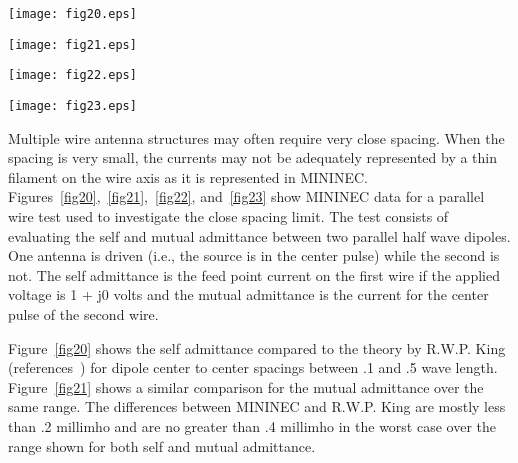 \documentclass[12pt]{article}
\begin{document}
\begin{sidewaysfigure}[htb]
\centerline{\texttt{[image: fig20.eps]}}
\caption{Self admittance computed by MININEC compared to the theory by
R. W. P. King for two parallel dipoles}
\label{fig20}
\end{sidewaysfigure}

\begin{sidewaysfigure}[htb]
\centerline{\texttt{[image: fig21.eps]}}
\caption{Mutual admittance computed by MININEC compared to the theory by
R. W. P. King for two parallel dipoles}
\label{fig21}
\end{sidewaysfigure}

\begin{sidewaysfigure}[htb]
\centerline{\texttt{[image: fig22.eps]}}
\caption{Magnitude of the mutual admittance between closely spaced
parallel dipoles}
\label{fig22}
\end{sidewaysfigure}

\begin{sidewaysfigure}[htb]
\centerline{\texttt{[image: fig23.eps]}}
\caption{Phase of the mutual admittance between closely spaced
parallel dipoles}
\label{fig23}
\end{sidewaysfigure}
\afterpage\clearpage

Multiple wire antenna structures may often require very close spacing.
When the spacing is very small, the currents may not be adequately
represented by a thin filament on the wire axis as it is represented in
MININEC. Figures~\ref{fig20},~\ref{fig21},~\ref{fig22}, and~\ref{fig23}
show MININEC data for a parallel wire test used to investigate the close
spacing limit. The test consists of evaluating the self and mutual
admittance between two parallel half wave dipoles. One antenna is driven
(i.e., the source is in the center pulse) while the second is not. The
self admittance is the feed point current on the first wire if the
applied voltage is 1 + j0 volts and the mutual admittance is the current
for the center pulse of the second wire.

Figure~\ref{fig20} shows the self admittance compared to the theory by
R.W.P. King (references~\cite{r9}) for dipole center to center spacings
between .1 and .5 wave length. Figure~\ref{fig21} shows a similar
comparison for the mutual admittance over the same range. The
differences between MININEC and R.W.P. King are mostly less than .2
millimho and are no greater than .4 millimho in the worst case over the
range shown for both self and mutual admittance.
\end{document}
